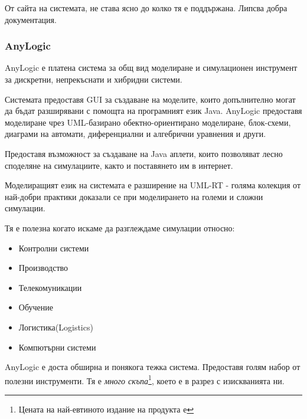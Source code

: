 			
				От сайта на системата, не става ясно до колко тя е поддържана. 
				Липсва добра документация.\cite{Simplex3}
		
		\subsubsection{AnyLogic}
		
			AnyLogic е платена система за общ вид моделиране и симулационен инструмент за 
			дискретни, непрекъснати и хибридни системи.
			
			
				Системата предоставя \ac{GUI} за създаване на моделите, 
				които допълнително могат да бъдат разширявани с помощта на програмният език Java. 			
				AnyLogic предоставя моделиране чрез UML-базирано обектно-ориентирано моделиране, блок-схеми, 
				диаграми на автомати, диференциални и алгебрични уравнения и други.


				Предоставя възможност за създаване на Java аплети, които позволяват 
				лесно споделяне на симулациите, както и поставянето им в интернет.
		
		
				Моделиращият език на системата е разширение на UML-RT - голяма колекция от най-добри практики
				доказали се при моделирането на големи и сложни симулации.
		
							
				Тя е полезна когато искаме да разглеждаме симулации относно:
				
				\begin{itemize}
					\item Контролни системи
					\item Производство
					\item Телекомуникации
					\item Обучение
					\item Логистика(Logistics)
					\item Компютърни системи
				\end{itemize}			
				
				
				AnyLogic е доста обширна и понякога тежка система. Предоставя голям набор от полезни инструменти.
				Тя е \emph{много скъпа}\footnote{Цената на най-евтиното издание на продукта е }, 
				което е в разрез с изискванията ни. \cite{AnyLogic}
			
